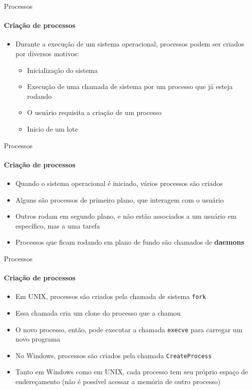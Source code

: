\documentclass{beamer}
\begin{document}
\begin{frame}{Processos}
	\framesubtitle{Criação de processos}
	\begin{itemize}
		\item Durante a execução de um sistema operacional, processos podem ser criados por diversos motivos:
		\begin{itemize}
			\item Inicialização do sistema
			\item Execução de uma chamada de sistema por um processo que já esteja rodando
			\item O usuário requisita a criação de um processo
			\item Inicio de um lote
		\end{itemize}
	\end{itemize}
\end{frame}
\begin{frame}{Processos}
	\framesubtitle{Criação de processos}
	\begin{itemize}
		\item Quando o sistema operacional é iniciado, vários processos são criados
		\item Alguns são processos de primeiro plano, que interagem com o usuário
		\item Outros rodam em segundo plano, e não estão associados a um usuário em específico, mas a uma tarefa
		\item Processos que ficam rodando em plano de fundo são chamados de \textbf{daemons}
	\end{itemize}
\end{frame}
\begin{frame}{Processos}
	\framesubtitle{Criação de processos}
	\begin{itemize}
		\item Em UNIX, processos são criados pela chamada de sistema \alert{\texttt{fork}}
		\item Essa chamada cria um clone do processo que a chamou
		\item O novo processo, então, pode executar a chamada \alert{\texttt{execve}} para carregar um novo programa
		\item No Windows, processos são criados pela chamada \alert{\texttt{CreateProcess}}
		\item Tanto em Windows como em UNIX, cada processo tem seu próprio espaço de endereçamento (não é possível acessar a memória de outro processo)
	\end{itemize}
\end{frame}
\end{document}
